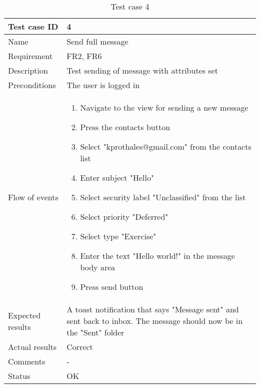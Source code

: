 		\begin{table}[htb]
			\begin{tabular}{l|p{10cm}}
				Test case ID & 4 \\ \hline
				Name & Send full message\\ \hline
				Requirement & FR2, FR6\\ \hline
				Description & Test sending of message with attributes set\\ \hline
				Preconditions & The user is logged in\\ \hline
				Flow of events & 
					\begin{enumerate}
						\item{}Navigate to the view for sending a new message
						\item{}Press the contacts button
						\item{}Select "kprothales@gmail.com" from the contacts list
						\item{}Enter subject "Hello"
						\item{}Select security label "Unclassified" from the list
						\item{}Select priority "Deferred"
						\item{}Select type "Exercise"
						\item{}Enter the text "Hello world!" in the message body area
						\item{}Press send button
					\end{enumerate} \\ \hline
				Expected results & A toast notification that says "Message sent" and sent back to inbox. The message 							should now be in the "Sent" folder\\ \hline
				Actual results & Correct\\ \hline
				Comments &-\\ \hline
				Status &OK \\ \hline
			\end{tabular}
			\caption{Test case 4} \label{tab:case4}
		\end{table}

